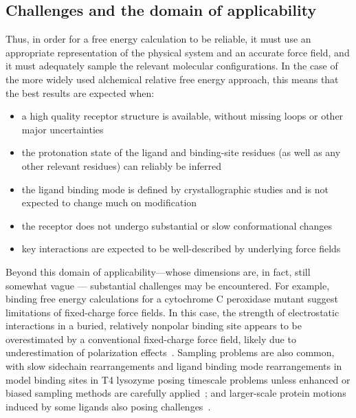 \documentclass[aps,pre,twocolumn,nofootinbib,superscriptaddress,10pt, final,tightenlines]{revtex4-1}
\begin{document}
\subsection{Challenges and the domain of applicability}
Thus, in order for a free energy calculation to be reliable, it must use an appropriate representation of the physical system and an accurate force field, and it must adequately sample the relevant molecular configurations. 
In the case of the more widely used alchemical relative free energy approach, this means that the best results are expected when:\vspace{2mm}
\begin{itemize}
\item a high quality receptor structure is available, without missing loops or other major uncertainties
\item the protonation state of the ligand and binding-site residues (as well as any other relevant residues) can reliably be inferred
\item the ligand binding mode is defined by crystallographic studies and is not expected to change much on modification
\item the receptor does not undergo substantial or slow conformational changes
\item key interactions are expected to be well-described by underlying force fields 
\end{itemize}
\vspace{2mm}

Beyond this domain of applicability---whose dimensions are, in fact, still somewhat vague --- substantial challenges may be encountered. 
For example, binding free energy calculations for a cytochrome C peroxidase mutant suggest limitations of fixed-charge force fields. In this case, the strength of electrostatic interactions in a buried, relatively nonpolar binding site appears to be overestimated by a conventional fixed-charge force field, likely due to underestimation of polarization effects~\cite{rocklin_blind_2013}. 
Sampling problems are also common, with slow sidechain rearrangements and ligand binding mode rearrangements in model binding sites in T4 lysozyme posing timescale problems unless enhanced or biased sampling methods are carefully applied~\cite{mobley_confine_2007, boyce_predicting_2009, mobley_predicting_2007, jiang_free_2010, gallicchio_binding_2010, wang_achieving_2012}; and larger-scale protein motions induced by some ligands also posing challenges~\cite{boyce_predicting_2009, lim_sensitivity_2016}. 
\end{document}
